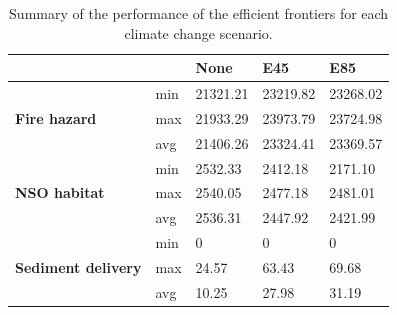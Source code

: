 \begin{table}[]
\centering
\caption[Summary of efficient frontiers]{Summary of the performance of the efficient frontiers for each climate change scenario.}
\label{tab:frontiersSummary}
\begin{tabular}{lllll}
\multicolumn{2}{l|}{}                                                  & \textbf{None} & \textbf{E45} & \textbf{E85} \\ \hline
\multirow{3}{*}{\textbf{Fire hazard}}       & \multicolumn{1}{l|}{min} & 21321.21      & 23219.82     & 23268.02     \\
                                            & \multicolumn{1}{l|}{max} & 21933.29      & 23973.79     & 23724.98     \\
                                            & \multicolumn{1}{l|}{avg} & 21406.26      & 23324.41     & 23369.57     \\ \hline
\multirow{3}{*}{\textbf{NSO habitat}}       & \multicolumn{1}{l|}{min} & 2532.33       & 2412.18      & 2171.10      \\
                                            & \multicolumn{1}{l|}{max} & 2540.05       & 2477.18      & 2481.01      \\
                                            & \multicolumn{1}{l|}{avg} & 2536.31       & 2447.92      & 2421.99      \\ \hline
\multirow{3}{*}{\textbf{Sediment delivery}} & \multicolumn{1}{l|}{min} & 0             & 0            & 0            \\
                                            & \multicolumn{1}{l|}{max} & 24.57         & 63.43        & 69.68        \\
                                            & \multicolumn{1}{l|}{avg} & 10.25         & 27.98        & 31.19        
\end{tabular}
\end{table}


